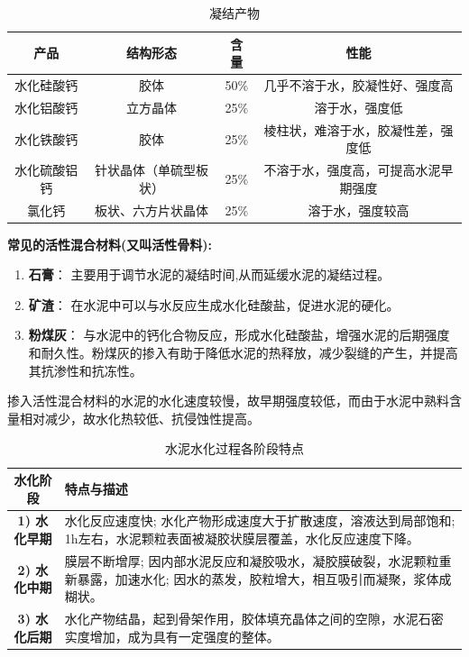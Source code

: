 \documentclass[12pt, a4paper, oneside, UTF8]{ctexbook}
\begin{document}
\begin{table}[htbp]
	\centering
	\begin{tabular}{|c|c|c|c|}
		\hline
		\textbf{产品} & \textbf{结构形态} & \textbf{含量} & \textbf{性能} \\ \hline
		水化硅酸钙 & 胶体 & 50\% & 几乎不溶于水，胶凝性好、强度高 \\ \hline
		水化铝酸钙 & 立方晶体 & 25\% & 溶于水，强度低 \\ \hline
		水化铁酸钙 & 胶体 & 25\% & 棱柱状，难溶于水，胶凝性差，强度低 \\ \hline
		水化硫酸铝钙 & 针状晶体（单硫型板状） & 25\% & 不溶于水，强度高，可提高水泥早期强度 \\ \hline
		氯化钙 & 板状、六方片状晶体 & 25\% & 溶于水，强度较高 \\ \hline
	\end{tabular}
	\caption{凝结产物}
\end{table}

\textbf{常见的活性混合材料(又叫活性骨料):}

\begin{enumerate}
	\item \textbf{石膏}：
	主要用于调节水泥的凝结时间,从而延缓水泥的凝结过程。
	
	\item \textbf{矿渣}：
	在水泥中可以与水反应生成水化硅酸盐，促进水泥的硬化。
	
	\item \textbf{粉煤灰}：
	与水泥中的钙化合物反应，形成水化硅酸盐，增强水泥的后期强度和耐久性。粉煤灰的掺入有助于降低水泥的热释放，减少裂缝的产生，并提高其抗渗性和抗冻性。
\end{enumerate}

掺入活性混合材料的水泥的水化速度较慢，故早期强度较低，而由于水泥中熟料含量相对减少，故水化热较低、抗侵蚀性提高。

\begin{table}[ht]
	\centering
	\begin{tabular}{|c|p{10cm}|}
		\hline
		\textbf{水化阶段} & \textbf{特点与描述} \\ \hline
		\textbf{1) 水化早期} & 水化反应速度快; 水化产物形成速度大于扩散速度，溶液达到局部饱和; 1h左右，水泥颗粒表面被凝胶状膜层覆盖，水化反应速度下降。 \\ \hline
		\textbf{2) 水化中期} & 膜层不断增厚; 因内部水泥反应和凝胶吸水，凝胶膜破裂，水泥颗粒重新暴露，加速水化; 因水的蒸发，胶粒增大，相互吸引而凝聚，浆体成糊状。 \\ \hline
		\textbf{3) 水化后期} & 水化产物结晶，起到骨架作用，胶体填充晶体之间的空隙，水泥石密实度增加，成为具有一定强度的整体。 \\ \hline
	\end{tabular}
	\caption{水泥水化过程各阶段特点}
\end{table}
\end{document}
